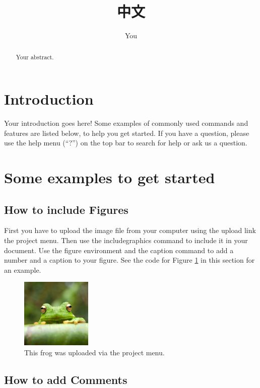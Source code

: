 \documentclass[a4paper]{article}
\title{中文}
\author{You}
\begin{document}
\maketitle

\begin{abstract}
Your abstract.
\end{abstract}

\section{Introduction}

Your introduction goes here! Some examples of commonly used commands and features are listed below, to help you get started. If you have a question, please use the help menu (``?'') on the top bar to search for help or ask us a question. 

\section{Some examples to get started}

\subsection{How to include Figures}

First you have to upload the image file from your computer using the upload link the project menu. Then use the includegraphics command to include it in your document. Use the figure environment and the caption command to add a number and a caption to your figure. See the code for Figure \ref{fig:frog} in this section for an example.

\begin{figure}
\centering
\includegraphics[width=0.3\textwidth]{frog.jpg}
\caption{\label{fig:frog}This frog was uploaded via the project menu.}
\end{figure}

\subsection{How to add Comments}
\end{document}
